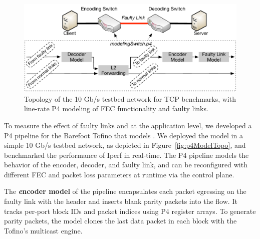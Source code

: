 



\begin{figure}
  \centering
  \includegraphics[width=0.4\paperwidth]{figures/lineRateModel.pdf}
  \caption{\label{fig:lineRateModel} Topology of the 10 Gb/s testbed 
  network for TCP benchmarks, with line-rate P4 modeling of FEC functionality and faulty links.}
\end{figure}

To measure the effect of faulty links and \OurSys at the application level, we
developed a P4 pipeline for the Barefoot Tofino that models \OurSys. We
deployed the model in a simple 10 Gb/s testbed network, as depicted in
Figure~\ref{fig:p4ModelTopo}, and benchmarked the performance of 
Iperf in real-time. The P4 pipeline models the behavior of the encoder, 
decoder, and faulty link, and can be reconfigured with different FEC and 
packet loss parameters at runtime via the control plane. 

The \textbf{\emph encoder model} of the pipeline encapsulates each packet egressing on
the faulty link with the \OurSys header and inserts blank  parity packets into
the flow. It tracks per-port block IDs and  packet indices using P4 register
arrays. To generate parity packets, the  model clones the last data packet in
each block with the Tofino's multicast engine.

